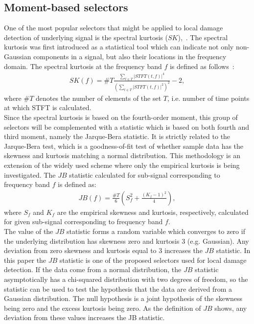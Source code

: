 \subsection{Moment-based selectors}
One of the most popular selectors that might be applied to local damage detection of underlying signal is the spectral kurtosis ($SK$),~\cite{Antoni2006308}. The spectral kurtosis  was first introduced as a statistical tool which can indicate not only non-Gaussian components in a signal, but also their locations in the frequency domain. The spectral kurtosis at the frequency band $f$ is defined as follows~\cite{Antoni2006308}:
\begin{eqnarray}\label{selection_spectral_kurtosis}
SK(f)=\#T\frac{\sum_{t\in T}|STFT(t,f)|^4}{(\sum_{t\in T}|STFT(t,f)|^2)^2}-2,
\end{eqnarray}
where $\#T$ denotes the number of elements of the set $T$, i.e. number of time points at which STFT is calculated.\\
Since the spectral kurtosis is based on the fourth-order moment, this group of selectors will be complemented with a statistic which is based on both fourth and third moment, namely the Jarque-Bera statistic. It is strictly related to the Jarque-Bera test, which is a goodness-of-fit test of whether sample data has the skewness and kurtosis matching a normal distribution. This methodology is an extension of the  widely used scheme where only the empirical kurtosis is being investigated. The $JB$ statistic calculated for sub-signal corresponding to frequency band $f$ is defined as:
\begin{eqnarray}
JB(f)=\frac{\#T}{6}\left(S_f^2+\frac{\left(K_f-1\right)^2}{4}\right),
\end{eqnarray}
where $S_f$ and $K_f$ are the empirical skewness and kurtosis, respectively, calculated for given sub-signal corresponding to frequency band $f$.\\
The value of the $JB$ statistic forms a random variable which converges to zero if the underlying distribution has skewness zero and kurtosis 3 (e.g. Gaussian). Any deviation from zero skewness and kurtosis equal to 3 increases the $JB$ statistic.  In this paper the $JB$ statistic is one of the proposed selectors used for local damage detection. If the data come from a normal distribution, the $JB$ statistic asymptotically has a chi-squared distribution with two degrees of freedom, so the statistic can be used to test the hypothesis that the data are derived from a Gaussian distribution. The null hypothesis is a joint hypothesis of the skewness being zero and the excess kurtosis being zero. As the definition of $JB$ shows, any deviation from these values increases the JB statistic.\\
